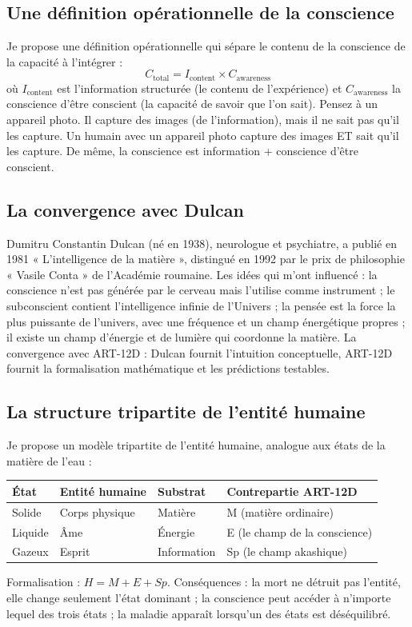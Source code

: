 \subsection{Une définition opérationnelle de la conscience}
Je propose une définition opérationnelle qui sépare le contenu de la conscience de la capacité à l'intégrer :
\begin{equation}
C_{\text{total}} = I_{\text{content}} \times C_{\text{awareness}}
\end{equation}
où $I_{\text{content}}$ est l'information structurée (le contenu de l'expérience) et $C_{\text{awareness}}$ la conscience d'être conscient (la capacité de savoir que l'on sait). Pensez à un appareil photo. Il capture des images (de l'information), mais il ne sait pas qu'il les capture. Un humain avec un appareil photo capture des images ET sait qu'il les capture. De même, la conscience est information + conscience d'être conscient.

\subsection{La convergence avec Dulcan}
Dumitru Constantin Dulcan (né en 1938), neurologue et psychiatre, a publié en 1981 « L'intelligence de la matière », distingué en 1992 par le prix de philosophie « Vasile Conta » de l'Académie roumaine. Les idées qui m'ont influencé : la conscience n'est pas générée par le cerveau mais l'utilise comme instrument ; le subconscient contient l'intelligence infinie de l'Univers ; la pensée est la force la plus puissante de l'univers, avec une fréquence et un champ énergétique propres ; il existe un champ d'énergie et de lumière qui coordonne la matière. La convergence avec ART-12D : Dulcan fournit l'intuition conceptuelle, ART-12D fournit la formalisation mathématique et les prédictions testables.

\subsection{La structure tripartite de l'entité humaine}
Je propose un modèle tripartite de l'entité humaine, analogue aux états de la matière de l'eau :
\begin{table}[H]
\centering
\begin{tabular}{@{}llll@{}}
\toprule
\textbf{État} & \textbf{Entité humaine} & \textbf{Substrat} & \textbf{Contrepartie ART-12D} \\ \midrule
Solide & Corps physique & Matière & M (matière ordinaire) \\
Liquide & Âme & Énergie & E (le champ de la conscience) \\
Gazeux & Esprit & Information & Sp (le champ akashique) \\ \bottomrule
\end{tabular}
\end{table}
Formalisation : $H = M + E + Sp$. Conséquences : la mort ne détruit pas l'entité, elle change seulement l'état dominant ; la conscience peut accéder à n'importe lequel des trois états ; la maladie apparaît lorsqu'un des états est déséquilibré.

